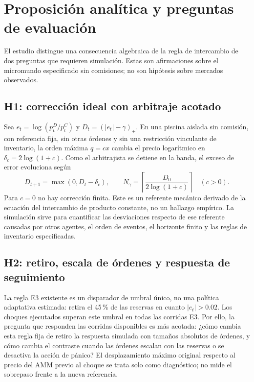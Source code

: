 \chapter{Proposición analítica y preguntas de evaluación}
\label{cap:hipotesis}

El estudio distingue una consecuencia algebraica de la regla de intercambio de dos preguntas que requieren simulación. Estas son afirmaciones sobre el micromundo especificado sin comisiones; no son hipótesis sobre mercados observados.

\section{H1: corrección ideal con arbitraje acotado}

Sea $e_t=\log(p_t^D/p_t^C)$ y $D_t=(|e_t|-\gamma)_+$. En una piscina aislada sin comisión, con referencia fija, sin otras órdenes y sin una restricción vinculante de inventario, la orden máxima $q=cx$ cambia el precio logarítmico en $\delta_c=2\log(1+c)$. Como el arbitrajista se detiene en la banda, el exceso de error evoluciona según
\[
  D_{t+1}=\max(0,D_t-\delta_c),\qquad
  N_\gamma=\left\lceil\frac{D_0}{2\log(1+c)}\right\rceil \quad(c>0).
\]
Para $c=0$ no hay corrección finita. Este es un referente mecánico derivado de la ecuación del intercambio de producto constante, no un hallazgo empírico. La simulación sirve para cuantificar las desviaciones respecto de ese referente causadas por otros agentes, el orden de eventos, el horizonte finito y las reglas de inventario especificadas.

\section{H2: retiro, escala de órdenes y respuesta de seguimiento}

La regla E3 existente es un disparador de umbral único, no una política adaptativa estimada: retira el 45\,\% de las reservas en cuanto $|e_t|>0.02$. Los choques ejecutados superan este umbral en todas las corridas E3. Por ello, la pregunta que responden las corridas disponibles es más acotada: ¿cómo cambia esta regla fija de retiro la respuesta simulada con tamaños absolutos de órdenes, y cómo cambia el contraste cuando las órdenes escalan con las reservas o se desactiva la acción de pánico? El desplazamiento máximo original respecto al precio del AMM previo al choque se trata solo como diagnóstico; no mide el sobrepaso frente a la nueva referencia.

